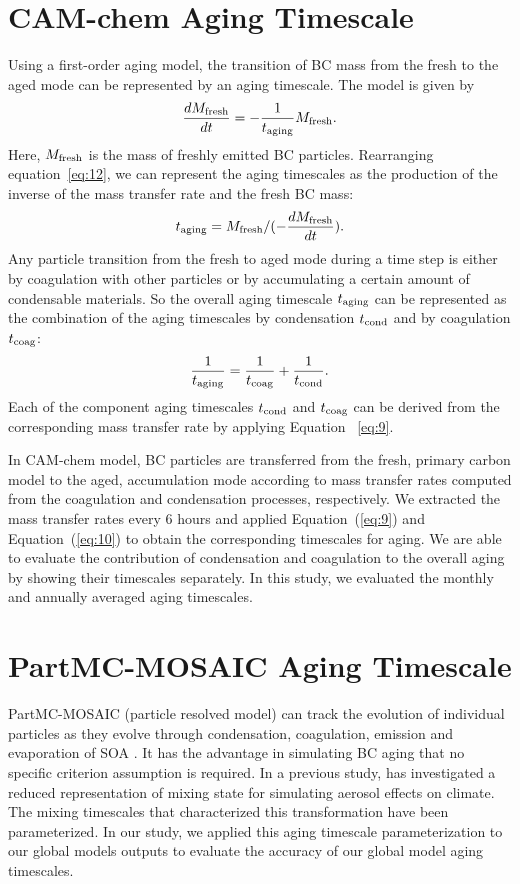 \documentclass[12pt, fullpage]{uiucthesis2009}
\begin{document}
	\section{CAM-chem Aging Timescale}
	Using a first-order aging model, the transition of BC mass from the fresh to the aged mode can be represented by an aging timescale. The model is given by
	\begin{align}\label{eq:12}
	\frac{dM_{\rm{fresh}}}{dt} = -\frac{1}{t_{\rm{aging}}}M_{\rm{fresh}}. 
	\end{align}
	Here, $M_{\rm{fresh}}$ is the mass of freshly emitted BC particles.
	Rearranging equation~\ref{eq:12}, we can represent the aging timescales as the production of the inverse of the mass transfer rate and the fresh BC mass: 
	\begin{align}\label{eq:9}
	t_{\rm{aging}} = M_{\rm{fresh}}/(-\frac{dM_{\rm{fresh}}}{dt}).
	\end{align}
	Any particle transition from the fresh to aged mode during a time step is either by coagulation with other particles or by accumulating a certain amount of condensable materials. So the overall aging timescale $t_{\rm{aging}}$ can be represented as the combination of the aging timescales by condensation $t_{\rm{cond}}$ and by coagulation $t_{\rm{coag}}$:
	\begin{align}\label{eq:10}
	\frac{1}{t_{\rm{aging}}} =\frac{1}{t_{\rm{coag}}} + \frac{1}{t_{\rm{cond}}}.
	\end{align}
	Each of the component aging timescales $t_{\rm{cond}}$ and $t_{\rm{coag}}$ can be derived from the corresponding mass transfer rate by applying Equation~ \ref{eq:9}. 
	
	In CAM-chem model, BC particles are transferred from the fresh, primary carbon model to the aged, accumulation mode according to mass transfer rates computed from the coagulation and condensation processes, respectively. We extracted the mass transfer rates every 6 hours and applied Equation~(\ref{eq:9}) and Equation~(\ref{eq:10}) to obtain the corresponding timescales for aging. We are able to evaluate the contribution of condensation and coagulation to the overall aging by showing their  timescales separately. In this study, we evaluated the monthly and annually averaged aging timescales. 
	
	\section{PartMC-MOSAIC Aging Timescale}\label{sec_4}
	PartMC-MOSAIC (particle resolved model) can track the evolution of individual particles as they evolve through condensation, coagulation, emission and evaporation of SOA \citep{riemer2009simulating}. It has the advantage in simulating BC aging that no specific criterion assumption is required. In a previous study, \citet{Fierce2016} has investigated a reduced representation of mixing state for simulating aerosol effects on climate. The mixing timescales that characterized this transformation have been parameterized. In our study, we applied this aging timescale parameterization to our global models outputs to evaluate the accuracy of our global model aging timescales.
	
\end{document}
